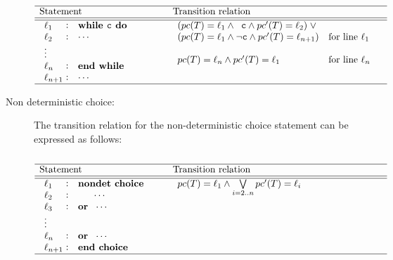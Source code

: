 \begin{description}
		\[
				\begin{array}[t]{p{8em}@{\hspace{6em}}p{\longtablesize}}
				\hline
				Statement & Transition relation \\ \hline\hline
				$\begin{array}[t]{l@{\hspace{0.3em}}c@{\hspace{1em}}l}
					\ell_1 & : & \mathtt{\textbf{while } c \textbf{ do }} \\
					\ell_2 & : & \mathtt{\cdots} \\
					\mathtt{\vdots} \\
					\ell_n & : & \mathtt{\textbf{end while}} \\
					\ell_{n+1} & : & \mathtt{\cdots}
				\end{array}$
				&
				$\begin{array}[t]{ll}
						(\pc(T) = \ell_1 \andcond \;\;\texttt{c} \andcond \pc'(T) = \ell_2) \; 
						\Or \\
						(\pc(T) = \ell_1 \andcond \lnot \texttt{c} \andcond \pc'(T) = 
					\ell_{n+1})
					& \text{for line $\ell_1$} \\ \\
					\pc(T) = \ell_n \andcond \pc'(T) = \ell_1 &
						\text{for line $\ell_n$}
				 \end{array}$ \\ \hline
			 \end{array}
		\]

			\item [Non deterministic choice:]
		The transition relation for the non-deterministic choice statement can 
		be expressed as follows:

		\[
			\begin{array}[t]{p{8em}@{\hspace{6em}}p{\longtablesize}}
				\hline
				Statement & Transition relation \\ \hline\hline
				$\begin{array}[t]{l@{\hspace{0.3em}}c@{\hspace{1em}}l}
					\ell_1 & : & \mathtt{\Nondet} \\
					\ell_2 & : & \mathtt{\;\;\;\;\;\; \cdots} \\
					\ell_3 & : & \mathtt{\textbf{or } \; \cdots} \\
					\mathtt{\vdots} \\
					\ell_n & : & \mathtt{\textbf{or } \; \cdots} \\
					\ell_{n+1} & : & \mathtt{\NondetEnd} \\
				\end{array}$
				&
				$\begin{array}[t]{ll}
					\pc(T) = \ell_1 \andcond
					\bigvee\limits_{i = 2..n} \pc'(T) = \ell_i
				 \end{array}$ \\ \hline
			 \end{array}
		\]



\end{description}

